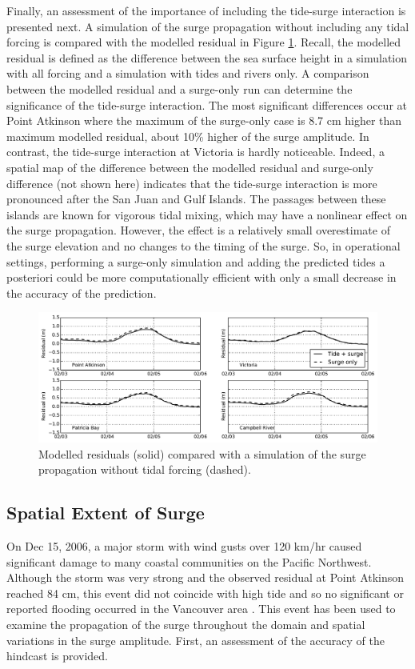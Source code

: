 \documentclass[pdftex,10pt]{article}
\begin{document}
Finally, an assessment of the importance of including the tide-surge interaction is presented next. A simulation of the surge propagation without including any tidal forcing is compared with the modelled residual in Figure \ref{fig:tidesurge}.  Recall, the modelled residual is defined as the difference between the sea surface height in a simulation with all forcing and a simulation with tides and rivers only. A comparison between the modelled residual and a surge-only run can determine the significance of the tide-surge interaction. The most significant differences occur at Point Atkinson where the maximum of the surge-only case is 8.7 cm higher than maximum modelled residual, about 10\% higher of the surge amplitude.  In contrast, the tide-surge interaction at Victoria is hardly noticeable. Indeed, a spatial map of the difference between the modelled residual and surge-only difference (not shown here) indicates that the tide-surge interaction is more pronounced after the San Juan and Gulf Islands. The passages between these islands are known for vigorous tidal mixing, which may have a nonlinear effect on the surge propagation. However, the effect is a relatively small overestimate of the surge elevation and no changes to the timing of the surge. So, in operational settings, performing a surge-only simulation and adding the predicted tides a posteriori could be more computationally efficient with only a small decrease in the accuracy of the prediction. 

\begin{figure}
\centering
\includegraphics[scale=0.6]{Figures/feb2006_tidesurge.pdf}
\caption{Modelled residuals (solid) compared with a simulation of the surge propagation without tidal forcing (dashed). }
\label{fig:tidesurge}
\end{figure}

\subsection{Spatial Extent of Surge}
On Dec 15, 2006, a major storm with wind gusts over 120 km/hr caused significant damage to many coastal communities on the Pacific Northwest. Although the storm was very strong and the observed residual at Point Atkinson reached 84 cm, this event did not coincide with high tide and so no significant or reported flooding occurred in the Vancouver area \citep{forseth2006adaptation}. This event has been used to examine the propagation of the surge throughout the domain and spatial variations in the surge amplitude. First, an assessment of the accuracy of the hindcast is provided. 
\end{document}
